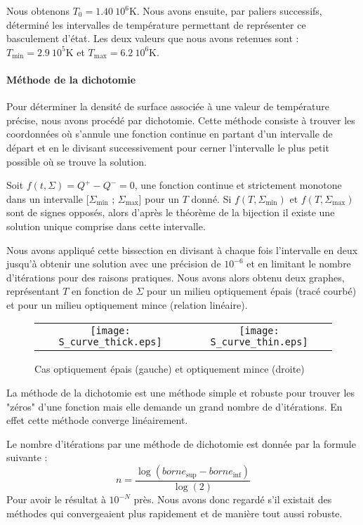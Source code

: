 Nous obtenons $T_0 =1.40\ 10^6 \mathrm{K}$. Nous avons ensuite, par paliers successifs, déterminé les intervalles de température permettant de représenter ce basculement d'état. Les deux valeurs que nous avons retenues sont : $T_\textrm{min} = 2.9\ 10^5 \mathrm{K}$ et $T_\textrm{max} = 6.2\ 10^6 \mathrm{K}$. 


\paragraph{Méthode de la dichotomie}

Pour déterminer la densité de surface associée à une valeur de température précise, nous avons procédé par dichotomie.
Cette méthode consiste à trouver les coordonnées où s'annule une fonction continue en partant d'un intervalle de départ et en le divisant successivement pour cerner l'intervalle le plus petit possible où se trouve la solution.  

Soit $f(t, \Sigma) = Q^+ - Q^- = 0$,  une fonction continue et strictement monotone dans un intervalle [$\Sigma_\textrm{min}$ ; $\Sigma_\textrm{max}$] pour un $T$ donné. Si $f(T,\Sigma_\textrm{min} )$ et $f(T,\Sigma_\textrm{max})$ sont de signes opposés, alors d'après le théorème de la bijection il existe une solution unique comprise dans cette intervalle. 

Nous avons appliqué cette bissection en divisant à chaque fois l'intervalle en deux jusqu'à obtenir une solution avec une précision de $10^{-6}$ et en limitant le nombre d'itérations pour des raisons pratiques. Nous avons alors obtenu deux graphes, représentant $T$ en fonction de $\Sigma$ pour un milieu optiquement épais (tracé courbé) et pour un milieu optiquement mince (relation linéaire).


\begin{figure}[htb!]
\centering
\begin{tabular}{cc} 
\texttt{[image: S\_curve\_thick.eps]} &
\texttt{[image: S\_curve\_thin.eps]} \\
\end{tabular}
  \caption{Cas optiquement épais (gauche) et optiquement mince (droite)}
\label{Fig::}
\end{figure}

La méthode de la dichotomie est une méthode simple et robuste pour trouver les "zéros" d'une fonction mais elle demande un grand nombre de d'itérations. En effet cette méthode converge linéairement.

Le nombre d'itérations par une méthode de dichotomie est donnée par la formule suivante : 
\begin{equation}
n = \frac{\log(borne_\mathrm{sup} - borne_\mathrm{inf})}{\log(2)} 
\end{equation}
Pour avoir le résultat à $10^{-N}$ près.
Nous avons donc regardé s'il existait des méthodes qui convergeaient plus rapidement et de manière tout aussi robuste. 

